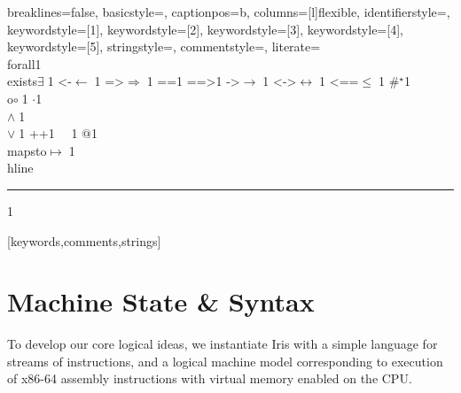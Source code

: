 {    %
    breaklines=false,
    basicstyle=\small,
    captionpos=b,
    columns=[l]flexible,
    identifierstyle={\ttfamily\color{black}},
    keywordstyle=[1]{\ttfamily\color{dkviolet}},
    keywordstyle=[2]{\ttfamily\color{dkgreen}},
    keywordstyle=[3]{\ttfamily\color{ltblue}},
    keywordstyle=[4]{\ttfamily\color{dkblue}},
    keywordstyle=[5]{\ttfamily\color{dkred}},
    stringstyle=\ttfamily,
    commentstyle={\ttfamily\color{dkgreen}},
    literate=
    {\\forall}{{\color{dkgreen}{$\forall\;$}}}1
    {\\exists}{{$\exists\;$}}1
    {<-}{{$\leftarrow\;$}}1
    {=>}{{$\Rightarrow\;$}}1
    {==}{{\code{==}\;}}1
    {==>}{{\code{==>}\;}}1
    {->}{{$\rightarrow\;$}}1
    {<->}{{$\leftrightarrow\;$}}1
    {<==}{{$\leq\;$}}1
    {\#}{{$^\star$}}1 
    {\\o}{{$\circ\;$}}1 
    {\@}{{$\cdot$}}1 
    {\/\\}{{$\wedge\;$}}1
    {\\\/}{{$\vee\;$}}1
    {++}{{\code{++}}}1
    {~}{{\ }}1
    {\@\@}{{$@$}}1
    {\\mapsto}{{$\mapsto\;$}}1
    {\\hline}{{\rule{\linewidth}{0.5pt}}}1
}[keywords,comments,strings]

\section{Machine State \& Syntax}
\label{sec:syntax}
To develop our core logical ideas, we instantiate \textsf{Iris} with a simple language for streams of instructions, 
and a logical machine model corresponding to execution of x86-64 assembly instructions with virtual memory enabled on the 
CPU.

